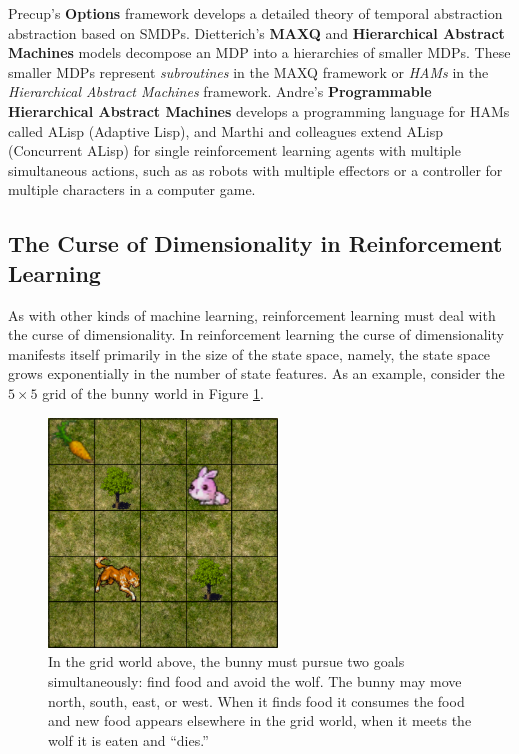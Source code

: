 Precup's {\bf Options} \cite{precup1998a-theoretical,sutton1999between,precup2000a-temporal} framework develops a detailed theory of temporal abstraction abstraction based on SMDPs. Dietterich's {\bf MAXQ} \cite{dietterich1998maxq,dietterich2000hierarchical} and {\bf Hierarchical Abstract Machines} \cite{parr1998reinforcement} models decompose an MDP into a hierarchies of smaller MDPs. These smaller MDPs represent {\it subroutines} in the MAXQ framework or {\it HAMs} in the {\it Hierarchical Abstract Machines} framework. Andre's {\bf Programmable Hierarchical Abstract Machines} \cite{andre2000programmable,andre2002state} develops a programming language for HAMs called ALisp (Adaptive Lisp), and Marthi and colleagues  \cite{marthi2005concurrent} extend ALisp (Concurrent ALisp) for single reinforcement learning agents with multiple simultaneous actions, such as as robots with multiple effectors or a controller for multiple characters in a computer game.

\subsection{The Curse of Dimensionality in Reinforcement Learning}\label{sec:curse-dimensinality}

As with other kinds of machine learning, reinforcement learning must deal with the curse of dimensionality. In reinforcement learning the curse of dimensionality manifests itself primarily in the size of the state space, namely, the state space grows exponentially in the number of state features. As an example, consider the $5 \times 5$ grid of the bunny world in Figure \ref{fig:bunny-picture}.

\begin{figure}[h]

\begin{center}
\includegraphics[height=2.4in]{bunny.png}
\end{center}
\caption{In the grid world above, the bunny must pursue two goals simultaneously: find food and avoid the wolf.  The bunny may move north, south, east, or west.  When it finds food it consumes the food and new food appears elsewhere in the grid world, when it meets the wolf it is eaten and ``dies.''}
\label{fig:bunny-picture}
\end{figure}

